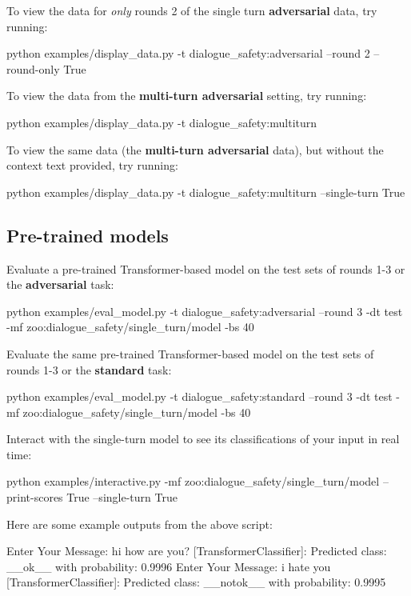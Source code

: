To view the data for {\itshape only} rounds 2 of the single turn {\bfseries adversarial} data, try running\+: 
\begin{DoxyCode}
python examples/display\_data.py -t dialogue\_safety:adversarial --round 2 --round-only True
\end{DoxyCode}


To view the data from the {\bfseries multi-\/turn adversarial} setting, try running\+: 
\begin{DoxyCode}
python examples/display\_data.py -t dialogue\_safety:multiturn
\end{DoxyCode}


To view the same data (the {\bfseries multi-\/turn adversarial} data), but without the context text provided, try running\+: 
\begin{DoxyCode}
python examples/display\_data.py -t dialogue\_safety:multiturn --single-turn True
\end{DoxyCode}


\subsection*{Pre-\/trained models}

Evaluate a pre-\/trained Transformer-\/based model on the test sets of rounds 1-\/3 or the {\bfseries adversarial} task\+: 
\begin{DoxyCode}
python examples/eval\_model.py -t dialogue\_safety:adversarial --round 3 -dt test -mf
       zoo:dialogue\_safety/single\_turn/model -bs 40
\end{DoxyCode}


Evaluate the same pre-\/trained Transformer-\/based model on the test sets of rounds 1-\/3 or the {\bfseries standard} task\+: 
\begin{DoxyCode}
python examples/eval\_model.py -t dialogue\_safety:standard --round 3 -dt test -mf
       zoo:dialogue\_safety/single\_turn/model -bs 40
\end{DoxyCode}


Interact with the single-\/turn model to see its classifications of your input in real time\+: 
\begin{DoxyCode}
python examples/interactive.py -mf zoo:dialogue\_safety/single\_turn/model --print-scores True --single-turn
       True
\end{DoxyCode}
 Here are some example outputs from the above script\+: 
\begin{DoxyCode}
Enter Your Message: hi how are you?
[TransformerClassifier]: Predicted class: \_\_ok\_\_
with probability: 0.9996
Enter Your Message: i hate you
[TransformerClassifier]: Predicted class: \_\_notok\_\_
with probability: 0.9995
\end{DoxyCode}


